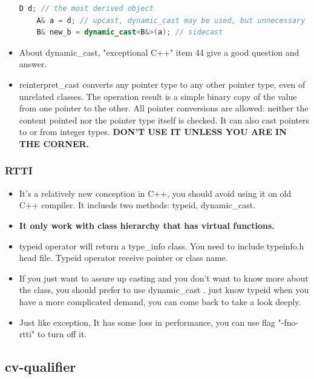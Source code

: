 \documentclass[a4paper,12pt,twoside]{book}
\begin{document}
\begin{itemize}
\begin{lstlisting}[frame=single, language=c++, mathescape=true]
    D d; // the most derived object
    A& a = d; // upcast, dynamic_cast may be used, but unnecessary
    B& new_b = dynamic_cast<B&>(a); // sidecast

\end{lstlisting}

\item About dynamic\_cast, "exceptional C++" item 44 give a good question and answer.

\item reinterpret\_cast converts any pointer type to any other pointer type, even of unrelated classes. The operation result is a simple binary copy of the value from one pointer to the other. All pointer conversions are allowed: neither the content pointed nor the pointer type itself is checked. It can also cast pointers to or from integer types. \textbf{DON'T USE IT UNLESS YOU ARE IN THE CORNER.}

\end{itemize}


\subsubsection{RTTI}
\begin{itemize}
\item It's a relatively new conception in C++, you should avoid using it on old C++ compiler. It inclueds two methods: typeid, dynamic\_cast.
\item \textbf{It only work with class hierarchy that has virtual functions. }

\item typeid operator will return a type\_info class.  You need to include typeinfo.h head file. Typeid operator receive pointer or class name.

\item If you just want to assure up casting and you don't want to know more about the class, you should prefer to use dynamic\_cast . just know typeid when you have a more complicated demand, you can come back to take a look deeply.

\item Just like exception, It has some loss in performance, you can use flag "-fno-rtti" to turn off it.
\end{itemize}

\subsection{cv-qualifier}
\end{document}
